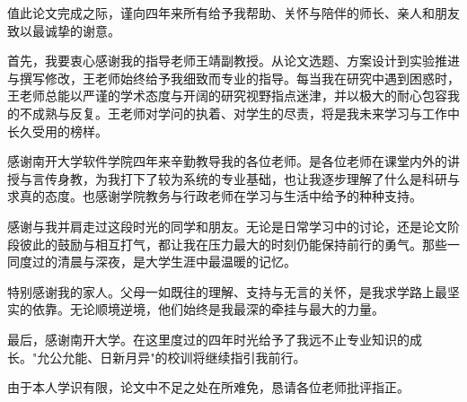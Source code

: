 
\zhixie

值此论文完成之际，谨向四年来所有给予我帮助、关怀与陪伴的师长、亲人和朋友致以最诚挚的谢意。

首先，我要衷心感谢我的指导老师王靖副教授。从论文选题、方案设计到实验推进与撰写修改，王老师始终给予我细致而专业的指导。每当我在研究中遇到困惑时，王老师总能以严谨的学术态度与开阔的研究视野指点迷津，并以极大的耐心包容我的不成熟与反复。王老师对学问的执着、对学生的尽责，将是我未来学习与工作中长久受用的榜样。

感谢南开大学软件学院四年来辛勤教导我的各位老师。是各位老师在课堂内外的讲授与言传身教，为我打下了较为系统的专业基础，也让我逐步理解了什么是科研与求真的态度。也感谢学院教务与行政老师在学习与生活中给予的种种支持。

感谢与我并肩走过这段时光的同学和朋友。无论是日常学习中的讨论，还是论文阶段彼此的鼓励与相互打气，都让我在压力最大的时刻仍能保持前行的勇气。那些一同度过的清晨与深夜，是大学生涯中最温暖的记忆。

特别感谢我的家人。父母一如既往的理解、支持与无言的关怀，是我求学路上最坚实的依靠。无论顺境逆境，他们始终是我最深的牵挂与最大的力量。

最后，感谢南开大学。在这里度过的四年时光给予了我远不止专业知识的成长。"允公允能、日新月异"的校训将继续指引我前行。

由于本人学识有限，论文中不足之处在所难免，恳请各位老师批评指正。

\endzhixie